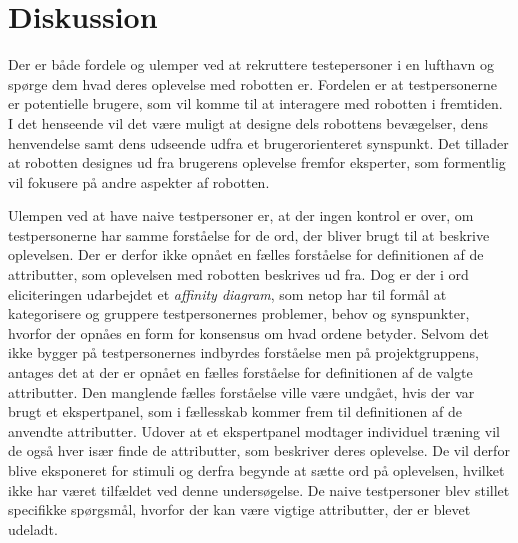 \section*{Diskussion}
\label{Diskussion}
%
Der er både fordele og ulemper ved at rekruttere testepersoner i en lufthavn og spørge dem hvad deres oplevelse med robotten er. Fordelen er at testpersonerne er potentielle brugere, som vil komme til at interagere med robotten i fremtiden. I det henseende vil det være muligt at designe dels robottens bevægelser, dens henvendelse samt dens udseende udfra et brugerorienteret synspunkt. Det tillader at robotten designes ud fra brugerens oplevelse fremfor eksperter, som formentlig vil fokusere på andre aspekter af robotten. 

Ulempen ved at have naive testpersoner er, at der ingen kontrol er over, om testpersonerne har samme forståelse for de ord, der bliver brugt til at beskrive oplevelsen. Der er derfor ikke opnået en fælles forståelse for definitionen af de attributter, som oplevelsen med robotten beskrives ud fra. Dog er der i ord eliciteringen udarbejdet et \textit{affinity diagram}, som netop har til formål at kategorisere og gruppere testpersonernes problemer, behov og synspunkter, hvorfor der opnåes en form for konsensus om hvad ordene betyder. Selvom det ikke bygger på testpersonernes indbyrdes forståelse men på projektgruppens, antages det at der er opnået en fælles forståelse for definitionen af de valgte attributter. Den manglende fælles forståelse ville være undgået, hvis der var brugt et ekspertpanel, som i fællesskab kommer frem til definitionen af de anvendte attributter. \blankline   
%
Udover at et ekspertpanel modtager individuel træning vil de også hver især finde de attributter, som beskriver deres oplevelse. De vil derfor blive eksponeret for stimuli og derfra begynde at sætte ord på oplevelsen, hvilket ikke har været tilfældet ved denne undersøgelse. De naive testpersoner blev stillet specifikke spørgsmål, hvorfor der kan være vigtige attributter, der er blevet udeladt. 
